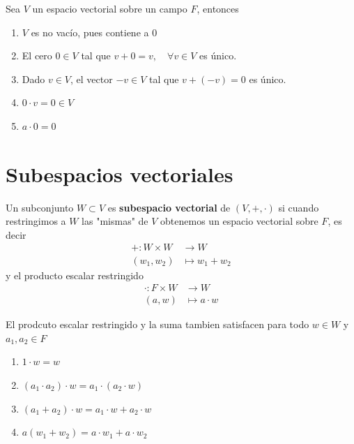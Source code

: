 \documentclass[12pt,a4paper]{book}
\begin{document}
    \begin{proposicion}
        Sea $V$ un espacio vectorial sobre un campo $F$, entonces
        \begin{enumerate}
            \item[(1)] $V$ es no vacío, pues contiene a 0
            \item[(2)] El cero $0\in V$ tal que $v+0=v,\quad\forall v\in V$ es único.
            \item[(3)] Dado $v\in V$, el vector $-v\in V$ tal que $v+(-v)=0$ es único.
            \item[(4)] $0\cdot v=0\in V$
            \item[(5)] $a\cdot 0=0$ 
        \end{enumerate}
    \end{proposicion}

    \section{Subespacios vectoriales}

    \begin{definicion}
        Un subconjunto $W\subset V$ es \textbf{subespacio vectorial} de $(V,+,\cdot)$ si
        cuando restringimos a $W$ las "mismas" de $V$ obtenemos un espacio vectorial sobre $F$,
        es decir
        \begin{align*}
            +:W\times W&\to W\\
            (w_{1},w_{2})&\mapsto w_{1}+w_{2}
        \end{align*}
        y el producto escalar restringido
        \begin{align*}
            \cdot:F\times W&\to W\\
            (a,w)&\mapsto a\cdot w
        \end{align*}
    \end{definicion}

    El prodcuto escalar restringido y la suma tambien satisfacen para todo $w\in W$ y $a_{1},a_{2}\in F$
    \begin{enumerate}
        \item[(a)] $1\cdot w=w$
        \item[(b)] $(a_{1}\cdot a_{2})\cdot w=a_{1}\cdot(a_{2}\cdot w)$
        \item[(c)] $(a_{1}+a_{2})\cdot w=a_{1}\cdot w+a_{2}\cdot w$
        \item[(d)] $a(w_{1}+w_{2})=a\cdot w_{1}+a\cdot w_{2}$  
    \end{enumerate}
\end{document}
